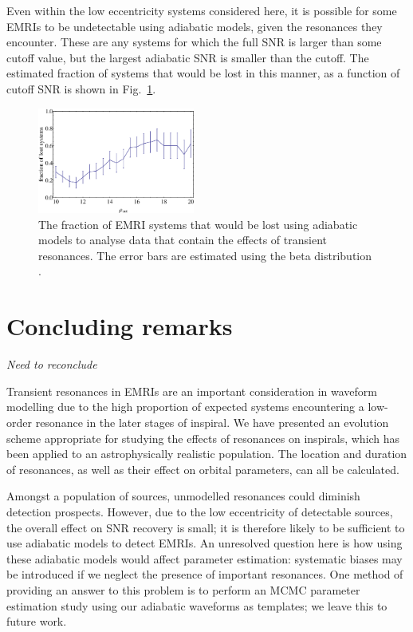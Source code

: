 \documentclass[aps,prd,amsfonts,amssymb,amsmath,nofootinbib,showpacs,superscriptaddress,twocolumn]{revtex4}
\newcommand{\figref}[1]{Fig.\ \ref{fig:#1}}
\begin{document}
Even within the low eccentricity systems considered here, it is possible for some EMRIs to be undetectable using adiabatic models, given the resonances they encounter. These are any systems for which the full SNR is larger than some cutoff value, but the largest adiabatic SNR is smaller than the cutoff. The estimated fraction of systems that would be lost in this manner, as a function of cutoff SNR is shown in \figref{SNRcutoff}.

\begin{figure}[htbp]
\centering
\includegraphics[width=0.46\textwidth]{Fig_SNRcutoff}
\caption{\label{fig:SNRcutoff}The fraction of EMRI systems that would be lost using adiabatic models to analyse data that contain the effects of transient resonances. The error bars are estimated using the beta distribution \cite{Cameron2011}.}
\end{figure}

\section{Concluding remarks}
\label{sec:conclusion}

\emph{Need to reconclude}

Transient resonances in EMRIs are an important consideration in waveform modelling due to the high proportion of expected systems encountering a low-order resonance in the later stages of inspiral. We have presented an evolution scheme appropriate for studying the effects of resonances on inspirals, which has been applied to an astrophysically realistic population. The location and duration of resonances, as well as their effect on orbital parameters, can all be calculated.

Amongst a population of sources, unmodelled resonances could diminish detection prospects. However, due to the low eccentricity of detectable sources, the overall effect on SNR recovery is small; it is therefore likely to be sufficient to use adiabatic models to detect EMRIs. An unresolved question here is how using these adiabatic models would affect parameter estimation: systematic biases may be introduced if we neglect the presence of important resonances. One method of providing an answer to this problem is to perform an MCMC parameter estimation study using our adiabatic waveforms as templates; we leave this to future work.
\end{document}
